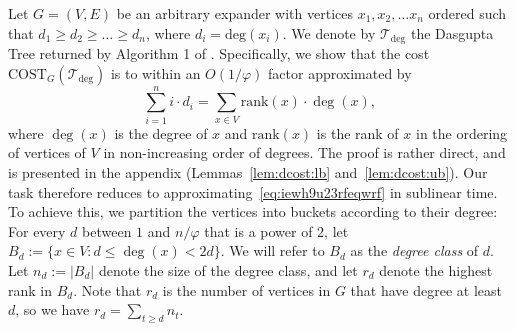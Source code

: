\documentclass[letterpaper,11pt]{article}
\newcommand{\tdeg}{\mathcal{T}_{\deg}}
\newcommand{\CT}{\text{COST}}
\newcommand{\rank}{\mathrm{rank}}
\theoremstyle{plain}
\theoremstyle{definition}
\theoremstyle{remark}
\begin{document}
Let $G = (V,E)$ be an arbitrary expander with vertices $x_1, x_2, \ldots x_n$ ordered such that $d_1 \geq d_2 \geq \ldots \geq d_n$, where $d_i = \text{deg}(x_i)$. We denote
by $\tdeg$ the Dasgupta Tree returned by Algorithm 1 of \cite{MSun21}. Specifically, we show that the cost  $\CT_G(\tdeg)$ is to within an $O(1/\varphi)$ factor approximated by
\begin{equation}\label{eq:iewh9u23rfeqwrf}
	\sum_{i=1}^{n} i \cdot d_i=\sum_{x\in V} \rank(x) \cdot \deg(x),
\end{equation}
where $\deg(x)$ is the degree of $x$ and $\rank(x)$ is the rank of $x$ in the ordering of vertices of $V$ in non-increasing order of degrees. The proof is rather direct, and is presented in the appendix (Lemmas~\ref{lem:dcost:lb} and~\ref{lem:dcost:ub}). Our task therefore reduces to approximating~\eqref{eq:iewh9u23rfeqwrf} in sublinear time. To achieve this, we partition the vertices into buckets according to their degree:  For every $d$ between $1$ and $n/\varphi$ that is a power of $2$, let $B_d := \{x \in V : d \leq \deg(x) <2d\}.$  We will refer to $B_d$ as the \emph{degree class} of $d$. Let $n_d:=|B_d|$ denote the size of the degree class, and let $r_d$ denote the highest rank in $B_d$.  Note that $r_d$ is the number of vertices in $G$ that have degree at least $d$, so we have $r_d= \sum_{t \geq d} n_t$. 
\end{document}
